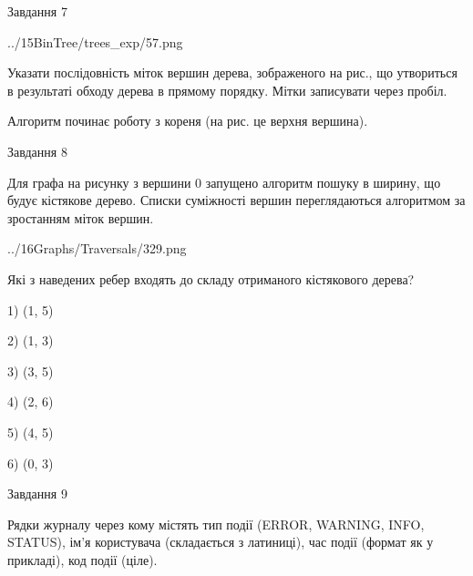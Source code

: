 \documentclass[12pt, ukrainian]{article}
\begin{document}
{\vspace{10mm}\par

\newpage
\begin{minipage}[t]{9.7cm}
               
{\begin{center}Завдання {7}\end{center}}
\vspace{-4mm}

\begin{center}
	{../15BinTree/trees_exp/57.png}
\end{center}
Указати послідовність міток вершин дерева, зображеного на рис., що утвориться в результаті обходу дерева в прямому порядку. Мітки записувати через пробіл.\par Алгоритм починає роботу з кореня (на рис. це верхня вершина).\par

\end{minipage}
\vline \hspace{8mm}
\begin{minipage}[t]{8.0cm}
               
{\begin{center}Завдання {8}\end{center}}
\vspace{-4mm}
Для графа на рисунку з вершини 0 запущено алгоритм пошуку в ширину, що будує кістякове дерево. Списки суміжності вершин переглядаються алгоритмом за зростанням міток вершин.\par
\begin{center}
	{../16Graphs/Traversals/329.png}
\end{center}
\par Які з наведених ребер входять до складу отриманого кістякового дерева?\par
1) (1, 5)\par
2) (1, 3)\par
3) (3, 5)\par
4) (2, 6)\par
5) (4, 5)\par
6) (0, 3)\par
{\vskip 15pt} \par

\end{minipage}

               
{\begin{center}Завдання {9}\end{center}}
\vspace{-4mm}
Рядки журналу через кому містять тип події (ERROR, WARNING, INFO, STATUS), ім'я користувача (складається з латиниці), час події (фор\-мат як у прикладі), код події (ціле).

}
\end{document}
